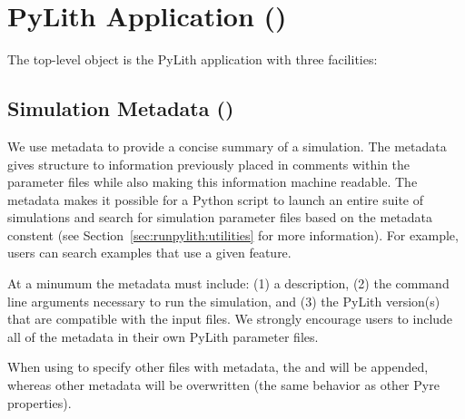 \section{PyLith Application (\protect{})}

The top-level object is the PyLith application with three facilities:
\begin{inventory}
\end{inventory}


\subsection{Simulation Metadata ()}

We use metadata to provide a concise summary of a simulation.
The metadata gives structure to information previously placed in comments within the parameter files while also making this information machine readable.
The metadata makes it possible for a Python script to launch an entire suite of simulations and search for simulation parameter files based on the metadata constent (see Section~\vref{sec:runpylith:utilities} for more information).
For example, users can search examples that use a given feature.

At a minumum the metadata must include: (1) a description, (2) the command line arguments necessary to run the simulation, and (3) the PyLith version(s) that are compatible with the input files.
We strongly encourage users to include all of the metadata in their own PyLith parameter files.
\begin{inventory}
\end{inventory}
When using  to specify other files with metadata, the  and  will be appended, whereas other metadata will be overwritten (the same behavior as other Pyre properties).


